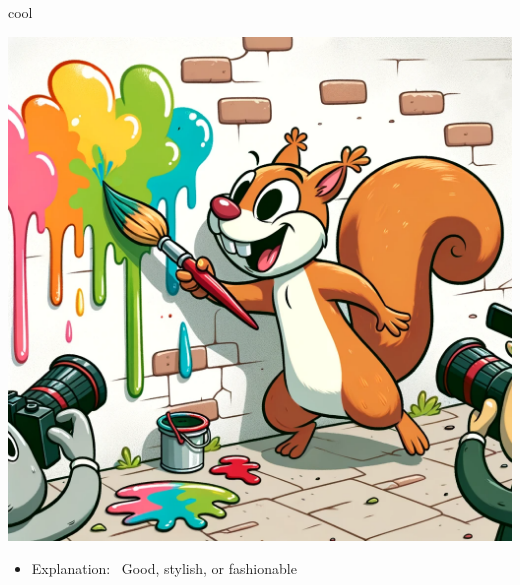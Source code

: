 \documentclass[avery5371, grid,frame]{flashcards}
\begin{document}
\renewcommand{\cardpaper}{a4paper}
\renewcommand{\cardpapermode}{landscape}
\renewcommand{\cardrows}{2}
\renewcommand{\cardcolumns}{2}
\setlength{\cardheight}{3.5in}
\setlength{\cardwidth}{5.0in}
\setlength{\topoffset}{0.50in}
\setlength{\oddoffset}{0.50in}
\setlength{\evenoffset}{0.50in}

\begin{flashcard}{cool}
    \vspace*{\fill}
    \begin{center}
        \begin{minipage}[c]{.45\textwidth}
            \includegraphics[width=\textwidth]{cards/c/cool/cool - a squirrel with a paintbrush, painting graffiti art on a wall, with other animals taking photos.png}
        \end{minipage}
        \begin{minipage}[c]{.45\textwidth}
            \begin{itemize}\setlength\itemsep{12pt}
            \item Explanation: \ Good, stylish, or fashionable


\end{itemize}
\end{minipage}
\end{center}
\end{flashcard}
\end{document}
